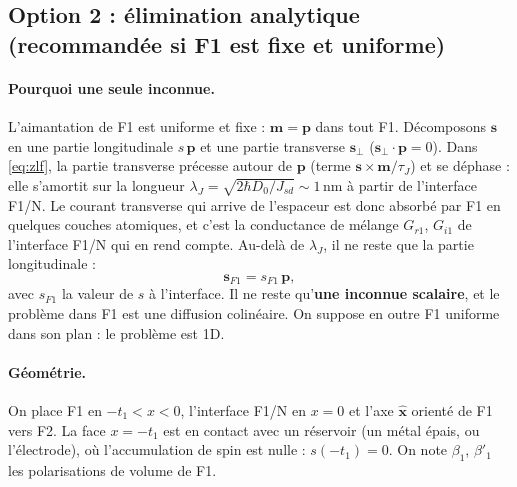 \documentclass[11pt,a4paper]{article}
\newcommand{\vm}{\bm{m}}
\newcommand{\vp}{\bm{p}}
\newcommand{\vs}{\bm{s}}
\begin{document}
\subsection{Option 2 : élimination analytique (recommandée si F1 est fixe et uniforme)}

\paragraph{Pourquoi une seule inconnue.} L'aimantation de F1 est uniforme
et fixe : $\vm = \vp$ dans tout F1. Décomposons $\vs$ en une partie
longitudinale $s\,\vp$ et une partie transverse $\vs_\perp$
($\vs_\perp\cdot\vp = 0$). Dans \eqref{eq:zlf}, la partie transverse
précesse autour de $\vp$ (terme $\vs\times\vm/\tau_J$) et se déphase : elle
s'amortit sur la longueur $\lambda_J = \sqrt{2\hbar D_0/J_{sd}}\sim1$\,nm
à partir de l'interface F1/N. Le courant transverse qui arrive de
l'espaceur est donc absorbé par F1 en quelques couches atomiques, et c'est
la conductance de mélange $G_{r1}$, $G_{i1}$ de l'interface F1/N qui en rend
compte. Au-delà de $\lambda_J$, il ne reste que la partie longitudinale :
\begin{equation}
  \vs_{F1} = s_{F1}\,\vp,
\end{equation}
avec $s_{F1}$ la valeur de $s$ à l'interface. Il ne reste qu'\textbf{une
inconnue scalaire}, et le problème dans F1 est une diffusion colinéaire.
On suppose en outre F1 uniforme dans son plan : le problème est 1D.

\paragraph{Géométrie.} On place F1 en $-t_1<x<0$, l'interface F1/N en
$x=0$ et l'axe $\hat{\bm{x}}$ orienté de F1 vers F2. La face $x=-t_1$ est
en contact avec un réservoir (un métal épais, ou l'électrode), où
l'accumulation de spin est nulle : $s(-t_1)=0$. On note $\beta_1$, $\beta'_1$
les polarisations de volume de F1.
\end{document}
